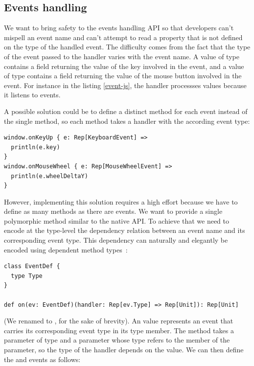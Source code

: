 \documentclass[american,english,runningheads]{llncs}
\begin{document}
\subsection{Events handling}

We want to bring safety to the events handling API so that developers can’t mispell an event name and can’t attempt to read a property that is not defined on the type of the handled event. The difficulty comes from the fact that the type of the event passed to the handler varies with the event name. A value of type  contains a  field returning the value of the key involved in the event, and a value of type  contains a  field returning the value of the mouse button involved in the event. For instance in the listing \ref{event-js}, the handler processses  values because it listens to  events.

A possible solution could be to define a distinct method for each event instead of the single  method, so each method takes a handler with the according event type:

\begin{lstlisting}
window.onKeyUp { e: Rep[KeyboardEvent] =>
  println(e.key)
}
window.onMouseWheel { e: Rep[MouseWheelEvent] =>
  println(e.wheelDeltaY)
}
\end{lstlisting}

However, implementing this solution requires a high effort because we have to define as many methods as there are events. We want to provide a single polymorphic method similar to the native API. To achieve that we need to encode at the type-level the dependency relation between an event name and its corresponding event type. This dependency can naturally and elegantly be encoded using dependent method types~\cite{Oliveira10_Typeclasses}:

\begin{lstlisting}
class EventDef {
  type Type
}

def on(ev: EventDef)(handler: Rep[ev.Type] => Rep[Unit]): Rep[Unit]
\end{lstlisting}

(We renamed  to , for the sake of brevity). An  value represents an event that carries its corresponding event type in its  type member. The  method takes a parameter  of type  and a  parameter whose type refers to the  member of the  parameter, so the type of the handler depends on the  value. We can then define the  and  events as follows:
\end{document}
